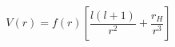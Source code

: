 \begin{equation} \label{scalar-potential}
V(r) = f(r) \left[\frac{l(l+1)}{r^2} + \frac{r_H}{r^3} \right]
\end{equation}

